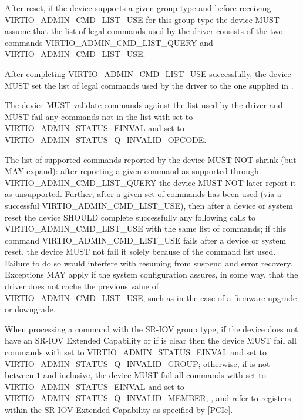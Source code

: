 After reset, if the device supports a given group type
and before receiving VIRTIO_ADMIN_CMD_LIST_USE for this group type
the device MUST assume
that the list of legal commands used by the driver consists of
the two commands VIRTIO_ADMIN_CMD_LIST_QUERY and VIRTIO_ADMIN_CMD_LIST_USE.

After completing VIRTIO_ADMIN_CMD_LIST_USE successfully,
the device MUST set the list of legal commands used by the driver
to the one supplied in .

The device MUST validate commands against the list used by
the driver and MUST fail any commands not in the list with
 set to VIRTIO_ADMIN_STATUS_EINVAL
and  set to
VIRTIO_ADMIN_STATUS_Q_INVALID_OPCODE.

The list of supported commands reported by the device MUST NOT
shrink (but MAY expand): after reporting a given command as
supported through VIRTIO_ADMIN_CMD_LIST_QUERY the device MUST NOT
later report it as unsupported.  Further, after a given set of
commands has been used (via a successful
VIRTIO_ADMIN_CMD_LIST_USE), then after a device or system reset
the device SHOULD complete successfully any following calls to
VIRTIO_ADMIN_CMD_LIST_USE with the same list of commands; if this
command VIRTIO_ADMIN_CMD_LIST_USE fails after a device or system
reset, the device MUST not fail it solely because of the command
list used.  Failure to do so would interfere with resuming from
suspend and error recovery. Exceptions MAY apply if the system
configuration assures, in some way, that the driver does not
cache the previous value of VIRTIO_ADMIN_CMD_LIST_USE,
such as in the case of a firmware upgrade or downgrade.

When processing a command with the SR-IOV group type,
if the device does not have an SR-IOV Extended Capability or
if  is clear
then the device MUST fail all commands with
 set to VIRTIO_ADMIN_STATUS_EINVAL and
 set to
VIRTIO_ADMIN_STATUS_Q_INVALID_GROUP;
otherwise, if  is not
between $1$ and  inclusive,
the device MUST fail all commands with
 set to VIRTIO_ADMIN_STATUS_EINVAL and
 set to
VIRTIO_ADMIN_STATUS_Q_INVALID_MEMBER;
,   and
 refer to registers within the SR-IOV Extended
Capability as specified by \hyperref[intro:PCIe]{[PCIe]}.



